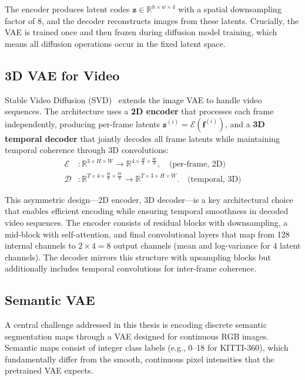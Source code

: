 The encoder produces latent codes $\mathbf{z} \in \mathbb{R}^{h \times w \times 4}$ with a spatial downsampling factor of 8, and the decoder reconstructs images from these latents. Crucially, the VAE is trained once and then frozen during diffusion model training, which means all diffusion operations occur in the fixed latent space.

\subsection{3D VAE for Video}
\label{subsec:3d_vae}

Stable Video Diffusion (SVD)~\cite{blattmann2023stable} extends the image VAE to handle video sequences. The architecture uses a \textbf{2D encoder} that processes each frame independently, producing per-frame latents $\mathbf{z}^{(i)} = \mathcal{E}(\mathbf{f}^{(i)})$, and a \textbf{3D temporal decoder} that jointly decodes all frame latents while maintaining temporal coherence through 3D convolutions:
\begin{align}
    \mathcal{E}&: \mathbb{R}^{3 \times H \times W} \rightarrow \mathbb{R}^{4 \times \frac{H}{8} \times \frac{W}{8}}, \quad \text{(per-frame, 2D)} \label{eq:svd_enc}\\
    \mathcal{D}&: \mathbb{R}^{T \times 4 \times \frac{H}{8} \times \frac{W}{8}} \rightarrow \mathbb{R}^{T \times 3 \times H \times W}. \quad \text{(temporal, 3D)} \label{eq:svd_dec}
\end{align}

This asymmetric design---2D encoder, 3D decoder---is a key architectural choice that enables efficient encoding while ensuring temporal smoothness in decoded video sequences. The encoder consists of residual blocks with downsampling, a mid-block with self-attention, and final convolutional layers that map from 128 internal channels to $2 \times 4 = 8$ output channels (mean and log-variance for 4 latent channels). The decoder mirrors this structure with upsampling blocks but additionally includes temporal convolutions for inter-frame coherence.

\subsection{Semantic VAE}
\label{subsec:semantic_vae}

A central challenge addressed in this thesis is encoding discrete semantic segmentation maps through a VAE designed for continuous RGB images. Semantic maps consist of integer class labels (e.g., 0--18 for KITTI-360), which fundamentally differ from the smooth, continuous pixel intensities that the pretrained VAE expects.


